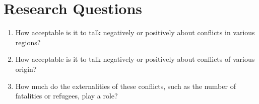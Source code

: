 \section{Research Questions}

\begin{enumerate}
\item{ How acceptable is it to talk negatively or positively about conflicts in various regions?} 
\item { How acceptable is it to talk negatively or positively about conflicts of various origin?} 
\item { How much do the externalities of these conflicts, such as the number of fatalities or refugees, play a role? }
\end{enumerate}

